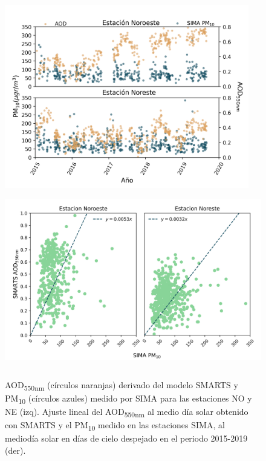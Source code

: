 \documentclass{article}
\begin{document}
\begin{center}
    \begin{figure}[H]
        \centering
        \includegraphics[height=8cm]{images/AODsandPM10.png}
        \includegraphics[height=7.7cm]{images/AODvsPM10.png}
        \caption{AOD\textsubscript{550nm} (círculos naranjas) derivado del modelo SMARTS y PM\textsubscript{10} (círculos azules) 
        medido por SIMA para las estaciones NO y NE (izq). Ajuste lineal del AOD\textsubscript{550nm} al medio día solar obtenido con SMARTS
        y el PM\textsubscript{10} medido en las estaciones SIMA, al mediodía solar en días de cielo despejado en el periodo 2015-2019 (der).}
    \end{figure}
\end{center}
\end{document}
